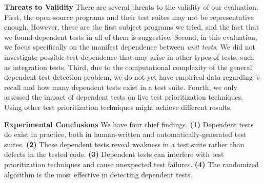 
\vspace{1mm}
\noindent \textbf{Threats to Validity}
There are several threats to the validity of our evaluation.
First, the \subjnum open-source
programs and their test suites may not be
representative enough. 
However, these are the first \subjnum subject programs
we tried, and the fact that we found dependent tests
in all of them is suggestive.
Second, in this evaluation, we focus specifically on
the {manifest dependence} between \textit{unit tests}.
We did not investigate possible test dependence that may arise
in other types of tests, such as integration tests.
Third, due to the computational complexity of the general dependent test
detection problem, we do not yet have
empirical data regarding \ourtool's recall and how many dependent
tests exist in a test suite. 
Fourth, we only assessed the
impact of dependent tests on five test prioritization
techniques.
Using other test prioritization techniques
might achieve different results. 


\vspace{1mm}

\noindent \textbf{Experimental Conclusions}
We have four chief findings. \textbf{(1)}
Dependent tests do exist in practice, both in
human-written and automatically-generated test suites.
\textbf{(2)} These dependent tests reveal weakness
in a test suite rather than defects in the tested code.
\textbf{(3)} Dependent tests can interfere with
test prioritization techniques and cause unexpected test failures.
\textbf{(4)} 
The randomized algorithm is the most effective in
detecting dependent tests.


